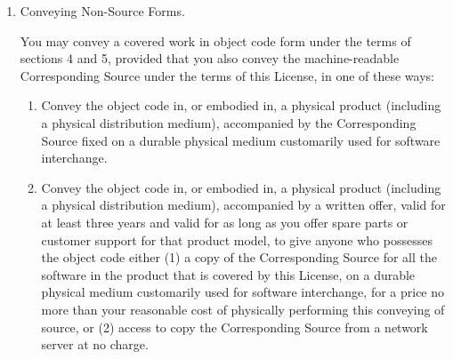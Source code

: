 \documentclass[10pt,a4paper,ngerman,titlepage,tocindentauto]{article}
\begin{document}
\begin{multicols}{3}
{\begin{enumerate}
\begin{enumerate}
						  \item If the work has interactive user interfaces, each must display
						  Appropriate Legal Notices; however, if the Program has interactive
						  interfaces that do not display Appropriate Legal Notices, your
						  work need not make them do so.
						\end{enumerate}
						A compilation of a covered work with other separate and independent
						works, which are not by their nature extensions of the covered work,
						and which are not combined with it such as to form a larger program,
						in or on a volume of a storage or distribution medium, is called an
						``aggregate'' if the compilation and its resulting copyright are not
						used to limit the access or legal rights of the compilation's users
						beyond what the individual works permit.  Inclusion of a covered work
						in an aggregate does not cause this License to apply to the other
						parts of the aggregate.

						\item Conveying Non-Source Forms.

						You may convey a covered work in object code form under the terms
						of sections 4 and 5, provided that you also convey the
						machine-readable Corresponding Source under the terms of this License,
						in one of these ways:
						  \begin{enumerate}
						  \item Convey the object code in, or embodied in, a physical product
						  (including a physical distribution medium), accompanied by the
						  Corresponding Source fixed on a durable physical medium
						  customarily used for software interchange.

						  \item Convey the object code in, or embodied in, a physical product
						  (including a physical distribution medium), accompanied by a
						  written offer, valid for at least three years and valid for as
						  long as you offer spare parts or customer support for that product
						  model, to give anyone who possesses the object code either (1) a
						  copy of the Corresponding Source for all the software in the
						  product that is covered by this License, on a durable physical
						  medium customarily used for software interchange, for a price no
						  more than your reasonable cost of physically performing this
						  conveying of source, or (2) access to copy the
						  Corresponding Source from a network server at no charge.


\end{enumerate}
\end{enumerate}}
\end{multicols}
\end{document}
